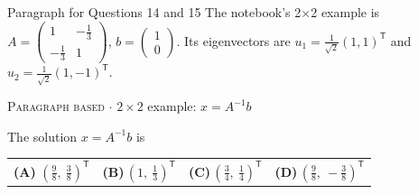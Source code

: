 \documentclass[11pt,a4paper]{article}
\newcommand{\optlabel}[1]{\textbf{(#1)}}
\newcommand{\correctlabel}[1]{\textcolor{okgreen}{\textbf{(#1)}\,\ding{51}}}
\newenvironment{qitem}[1]{\begin{list}{}{\setlength{\leftmargin}{3.3em}\setlength{\labelwidth}{3.1em}%
  \setlength{\labelsep}{0.2em}\setlength{\topsep}{3pt}\setlength{\parsep}{3pt}}\item[\textbf{Q.#1}\hfill]}{\end{list}}
\newcommand{\qmeta}[2]{{\footnotesize\color{black!60}\textsc{#1} \;$\cdot$\; #2}\par}
\begin{document}
\begin{passagebox}{Paragraph for Questions 14 and 15}
The notebook's 2$\times$2 example is $A = \begin{pmatrix}1 & -\tfrac13\\ -\tfrac13 & 1\end{pmatrix}$, $b = \begin{pmatrix}1\\0\end{pmatrix}$. Its eigenvectors are
$u_1 = \tfrac{1}{\sqrt2}(1, 1)^{\mathsf T}$ and $u_2 = \tfrac{1}{\sqrt2}(1, -1)^{\mathsf T}$.
\end{passagebox}
\begin{qitem}{14}
\qmeta{Paragraph based}{$2\times2$ example: $x = A^{-1}b$}
The solution $x = A^{-1}b$ is
\par\smallskip\noindent\begin{tabularx}{\linewidth}{@{}*{4}{L}@{}}
\correctlabel{A}\,$(\tfrac98,\ \tfrac38)^{\mathsf T}$ & \optlabel{B}\,$(1,\ \tfrac13)^{\mathsf T}$ & \optlabel{C}\,$(\tfrac34,\ \tfrac14)^{\mathsf T}$ & \optlabel{D}\,$(\tfrac98,\ -\tfrac38)^{\mathsf T}$
\end{tabularx}
\end{qitem}
\end{document}
